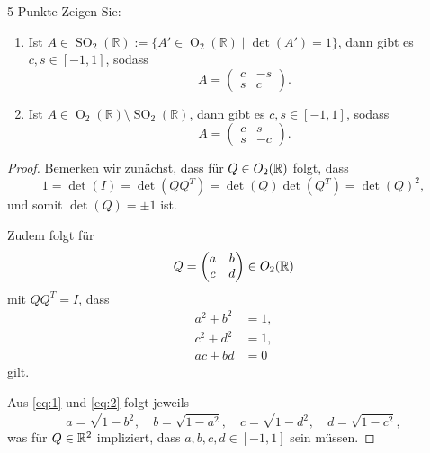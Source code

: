 \documentclass{problemset}
\begin{document}
\begin{problem}{5 Punkte}
Zeigen Sie:
\begin{enumerate}
    \item Ist $A \in \operatorname{SO}_2(\mathbb{R}) := \{A' \in
          \operatorname{O}_2(\mathbb{R}) \mid \det(A') = 1\}$, dann gibt es $c,
          s \in [-1, 1]$, sodass
          \[
              A = \begin{pmatrix}
                  c & -s \\
                  s & c
              \end{pmatrix}.
          \]
    \item Ist $A \in \operatorname{O}_2(\mathbb{R}) \setminus
          \operatorname{SO}_2(\mathbb{R})$, dann gibt es $c, s \in [-1, 1]$,
          sodass
          \[
              A = \begin{pmatrix}
                  c & s  \\
                  s & -c
              \end{pmatrix}.
          \]
\end{enumerate}
\begin{proof}
    Bemerken wir zunächst, dass für \(Q \in O_2(\mathbb{R})\) folgt, dass
    \begin{equation*}
        1 = \det(I) = \det(Q Q^T) = \det(Q) \det(Q^T) = \det(Q)^2,
    \end{equation*}
    und somit \(\det(Q) = \pm 1\) ist.

    Zudem folgt für
    \[
        Q = \begin{pmatrix}
            a & b \\
            c & d
        \end{pmatrix} \in O_2(\mathbb{R})
    \]
    mit \(Q Q^T = I\), dass
    \begin{align}
        a^2 + b^2 & = 1, \label{eq:1} \\
        c^2 + d^2 & = 1, \label{eq:2} \\
        ac + bd   & = 0 \label{eq:3}
    \end{align}
    gilt.

    Aus \eqref{eq:1} und \eqref{eq:2} folgt jeweils
    \begin{equation*}
        a = \sqrt{1 - b^2}, \quad b = \sqrt{1 - a^2}, \quad c = \sqrt{1 - d^2}, \quad d = \sqrt{1 - c^2},
    \end{equation*}
    was für \(Q \in \mathbb{R}^2\) impliziert, dass \(a, b, c, d \in [-1, 1]\) sein müssen.


\end{proof}
\end{problem}
\end{document}
